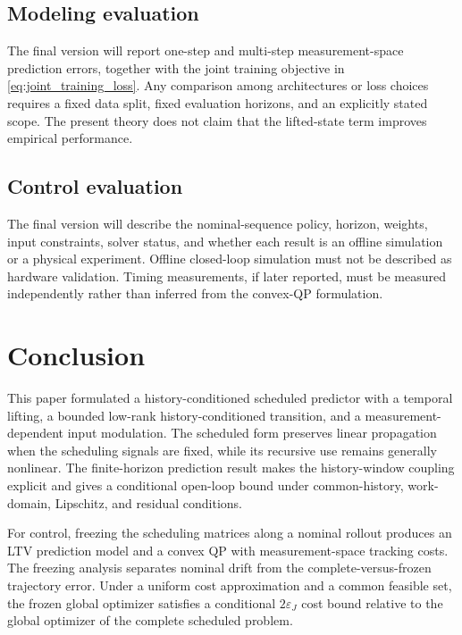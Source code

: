 \documentclass[journal]{IEEEtran}
\begin{document}
\subsection{Modeling evaluation}

The final version will report one-step and multi-step measurement-space prediction errors, together with the joint training objective in \eqref{eq:joint_training_loss}. Any comparison among architectures or loss choices requires a fixed data split, fixed evaluation horizons, and an explicitly stated scope. The present theory does not claim that the lifted-state term improves empirical performance.

\subsection{Control evaluation}

The final version will describe the nominal-sequence policy, horizon, weights, input constraints, solver status, and whether each result is an offline simulation or a physical experiment. Offline closed-loop simulation must not be described as hardware validation. Timing measurements, if later reported, must be measured independently rather than inferred from the convex-QP formulation.

\section{Conclusion}
\label{sec:conclusion}

This paper formulated a history-conditioned scheduled predictor with a temporal lifting, a bounded low-rank history-conditioned transition, and a measurement-dependent input modulation. The scheduled form preserves linear propagation when the scheduling signals are fixed, while its recursive use remains generally nonlinear. The finite-horizon prediction result makes the history-window coupling explicit and gives a conditional open-loop bound under common-history, work-domain, Lipschitz, and residual conditions.

For control, freezing the scheduling matrices along a nominal rollout produces an LTV prediction model and a convex QP with measurement-space tracking costs. The freezing analysis separates nominal drift from the complete-versus-frozen trajectory error. Under a uniform cost approximation and a common feasible set, the frozen global optimizer satisfies a conditional $2\varepsilon_J$ cost bound relative to the global optimizer of the complete scheduled problem.
\end{document}
